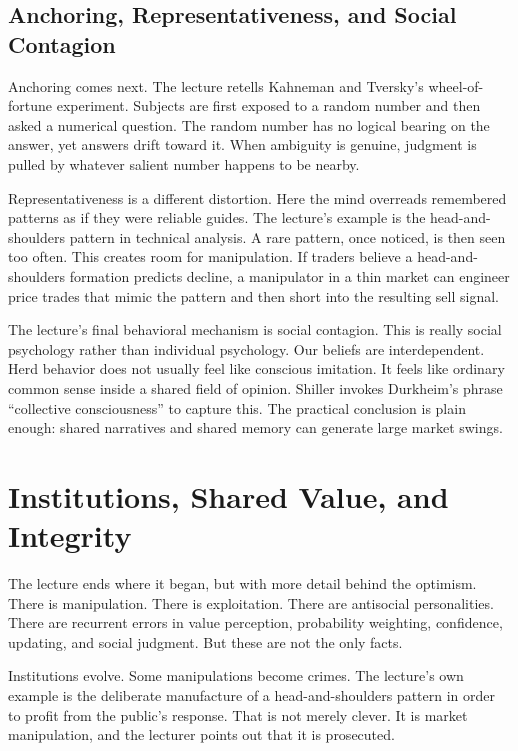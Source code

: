 \subsection{Anchoring, Representativeness, and Social Contagion}

Anchoring comes next. The lecture retells Kahneman and Tversky's wheel-of-fortune experiment. Subjects are first exposed to a random number and then asked a numerical question. The random number has no logical bearing on the answer, yet answers drift toward it. When ambiguity is genuine, judgment is pulled by whatever salient number happens to be nearby.

Representativeness is a different distortion. Here the mind overreads remembered patterns as if they were reliable guides. The lecture's example is the head-and-shoulders pattern in technical analysis. A rare pattern, once noticed, is then seen too often. This creates room for manipulation. If traders believe a head-and-shoulders formation predicts decline, a manipulator in a thin market can engineer price trades that mimic the pattern and then short into the resulting sell signal.

The lecture's final behavioral mechanism is social contagion. This is really social psychology rather than individual psychology. Our beliefs are interdependent. Herd behavior does not usually feel like conscious imitation. It feels like ordinary common sense inside a shared field of opinion. Shiller invokes Durkheim's phrase ``collective consciousness'' to capture this. The practical conclusion is plain enough: shared narratives and shared memory can generate large market swings.

\section{Institutions, Shared Value, and Integrity}

The lecture ends where it began, but with more detail behind the optimism. There is manipulation. There is exploitation. There are antisocial personalities. There are recurrent errors in value perception, probability weighting, confidence, updating, and social judgment. But these are not the only facts.

Institutions evolve. Some manipulations become crimes. The lecture's own example is the deliberate manufacture of a head-and-shoulders pattern in order to profit from the public's response. That is not merely clever. It is market manipulation, and the lecturer points out that it is prosecuted.


